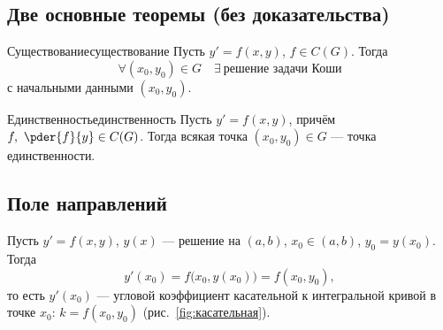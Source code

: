 
\subsection{Две основные теоремы (без доказательства)}

\begin{Theorem}{Существование}{существование}
	Пусть $y' = f(x,y)$, $f \in C(G)$. Тогда
	\[
	\forall (x_0,y_0) \in G \quad \exists\ \text{решение задачи Коши}
	\]
	с начальными данными $(x_0,y_0)$.
\end{Theorem}

\begin{Theorem}{Единственность}{единственность}
	Пусть $y' = f(x,y)$, причём $f,\ \pder{f}{y} \in C(G)$. Тогда всякая точка
	$(x_0,y_0) \in G$ --- точка единственности.
\end{Theorem}

\subsection{Поле направлений}

Пусть $y' = f(x,y)$, $y(x)$ --- решение на $(a,b)$, $x_0 \in (a,b)$,
$y_0 = y(x_0)$. Тогда
\[
y'(x_0) = f\bigl(x_0, y(x_0)\bigr) = f(x_0,y_0),
\]
то есть $y'(x_0)$ --- угловой коэффициент касательной к интегральной кривой
в точке $x_0$: $k = f(x_0,y_0)$ (рис.~\ref{fig:касательная}).

